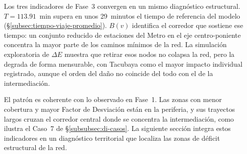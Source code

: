 Los tres indicadores de Fase~3 convergen en un mismo diagnóstico estructural.
$T = 113.91$~min supera en unos 29~minutos el tiempo de referencia del modelo
(§\ref{subsec:tiempo-viaje-promedio}). $B(v)$ identifica el corredor que sostiene
ese tiempo: un conjunto reducido de estaciones del Metro en el eje
centro-poniente concentra la mayor parte de los caminos mínimos de la red. La
simulación exploratoria de $\Delta E$ muestra que retirar esos nodos no colapsa
la red, pero la degrada de forma mensurable, con Tacubaya como el mayor impacto
individual registrado, aunque el orden del daño no coincide del todo con el de
la intermediación.

El patrón es coherente con lo observado en Fase~1. Las zonas con menor cobertura
y mayor Factor de Desviación están en la periferia, y sus trayectos largos
cruzan el corredor central donde se concentra la intermediación, como ilustra el
Caso~7 de §\ref{subsubsec:di-casos}. La siguiente sección integra estos
indicadores en un diagnóstico territorial que localiza las zonas de déficit
estructural de la red.
